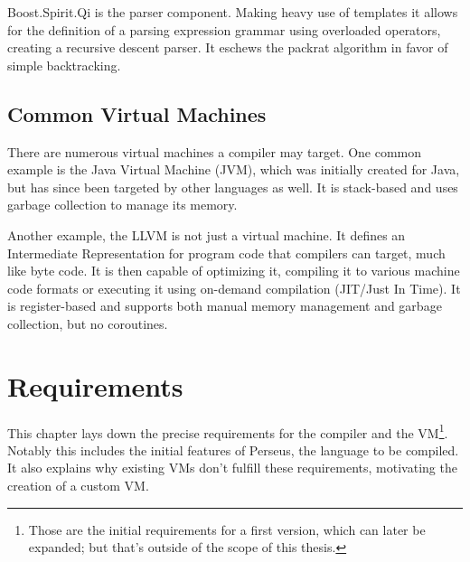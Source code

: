 		Boost.Spirit.Qi is the parser component. Making heavy use of templates it allows for the definition of a parsing expression grammar using overloaded operators, creating a recursive descent parser. It eschews the packrat algorithm in favor of simple backtracking.

	\section{Common Virtual Machines}
		
		There are numerous virtual machines a compiler may target. One common example is the Java Virtual Machine (JVM), which was initially created for Java, but has since been targeted by other languages as well. It is stack-based and uses garbage collection to manage its memory.
		
		Another example, the LLVM is not just a virtual machine. It defines an Intermediate Representation for program code that compilers can target, much like byte code. It is then capable of optimizing it, compiling it to various machine code formats or executing it using on-demand compilation (JIT/Just In Time). It is register-based and supports both manual memory management and garbage collection, but no coroutines.
	

\chapter{Requirements}\label{requirements}

	
	This chapter lays down the precise requirements for the compiler and the VM\footnote{Those are the initial requirements for a first version, which can later be expanded; but that's outside of the scope of this thesis.}. Notably this includes the initial features of Perseus, the language to be compiled. It also explains why existing VMs don't fulfill these requirements, motivating the creation of a custom VM.

